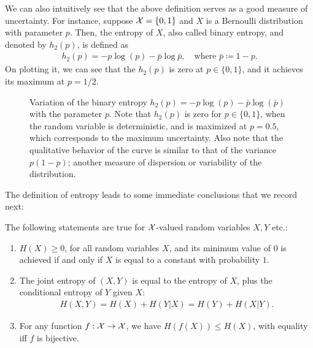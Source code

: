         We can also intuitively see that the above definition serves as a good measure of uncertainty. For instance, suppose $\mathcal{X} = \{0, 1\}$ and $X$ is a Bernoulli distribution with parameter $p$. Then, the entropy of $X$, also called binary entropy, and denoted by $h_2(p)$, is defined as 
        \begin{align}
            h_2(p) = -p \log (p) - \bar{p} \log \bar{p}, \quad \text{where } \bar{p} \coloneqq 1 - p. 
        \end{align}
        On plotting it, we can see that the $h_2(p)$ is zero at $p \in \{0, 1\}$, and it achieves its maximum at $p=1/2$. 

        \begin{figure}
            \centering
             
            \caption{Variation of the binary entropy $h_2(p) = -p \log(p) - \bar{p} \log(\bar{p})$ with the parameter $p$. Note that $h_2(p)$ is zero for $p \in \{0, 1\}$, when the random variable is deterministic, and is maximized at $p=0.5$, which corresponds to the maximum uncertainty. Also note that the qualitative behavior of the curve is similar to that of the variance $p(1-p)$; another measure of dispersion or variability of the distribution.}
            \label{fig:binary-entropy}
        \end{figure}

        The definition of entropy leads to some immediate conclusions that we record next: 
        \begin{proposition}
            The following statements are true for $\mathcal{X}$-valued random variables $X, Y$ etc.: 
            \begin{enumerate}[label=(\alph*)]
                \item  $H(X) \geq 0$, for all random variables $X$, and its minimum value of $0$ is achieved if and only if $X$ is equal to a constant with probability $1$. 
                \item The joint entropy of $(X, Y)$ is equal to the entropy of $X$, plus the conditional entropy of $Y$ given $X$:
                \begin{align}
                    H(X, Y) = H(X) + H(Y|X) = H(Y) + H(X|Y). 
                \end{align}
                \item For any function $f: \mathcal{X} \to \mathcal{X}$, we have $H(f(X)) \leq H(X)$, with equality iff $f$ is bijective. 
            \end{enumerate}
        \end{proposition}

